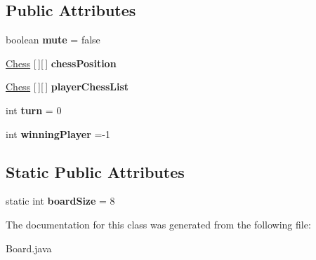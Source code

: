 \subsection*{Public Attributes}
\begin{DoxyCompactItemize}
\item 
\mbox{\label{classchess_library_1_1_board_aaa2ad24366b7716020708cd7e9fa54b0}} 
boolean {\bfseries mute} = false
\item 
\mbox{\label{classchess_library_1_1_board_aca7aa839370f2254fa8fb46f82996188}} 
\hyperlink{classchess_library_1_1_chess}{Chess} \mbox{[}$\,$\mbox{]}\mbox{[}$\,$\mbox{]} {\bfseries chess\+Position}
\item 
\mbox{\label{classchess_library_1_1_board_ab65014a0c2f21c604819e2551bcd400b}} 
\hyperlink{classchess_library_1_1_chess}{Chess} \mbox{[}$\,$\mbox{]}\mbox{[}$\,$\mbox{]} {\bfseries player\+Chess\+List}
\item 
\mbox{\label{classchess_library_1_1_board_a3fd9afa635948753fc6609baab2b1239}} 
int {\bfseries turn} = 0
\item 
\mbox{\label{classchess_library_1_1_board_a7cfa4b79e35c3f7baff0e2d584674ddc}} 
int {\bfseries winning\+Player} =-\/1
\end{DoxyCompactItemize}
\subsection*{Static Public Attributes}
\begin{DoxyCompactItemize}
\item 
\mbox{\label{classchess_library_1_1_board_a1bc8a3845eecddf03287e442369e0442}} 
static int {\bfseries board\+Size} = 8
\end{DoxyCompactItemize}


The documentation for this class was generated from the following file\+:\begin{DoxyCompactItemize}
\item 
Board.\+java\end{DoxyCompactItemize}
